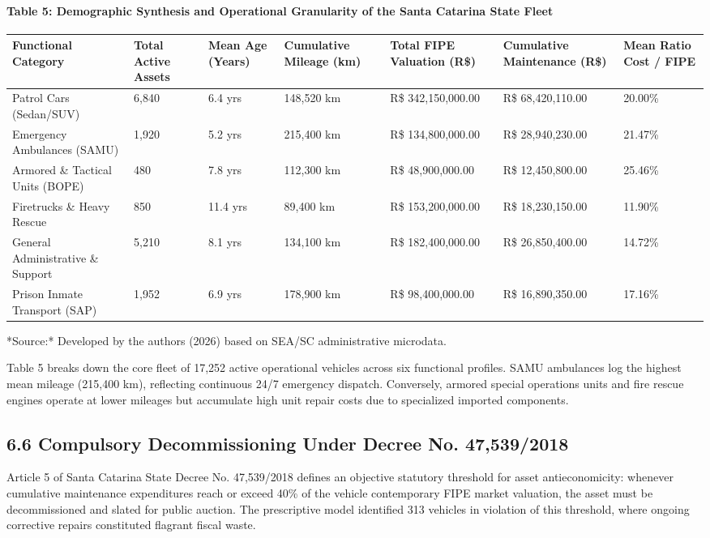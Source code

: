 \documentclass[10pt,a4paper,journal]{article}
\begin{document}
\paragraph{Table 5: Demographic Synthesis and Operational Granularity of the Santa Catarina State Fleet}
\begin{table}[htbp]
\centering
\small
\begin{tabular}{lllllll}
\toprule
Functional Category & Total Active Assets & Mean Age (Years) & Cumulative Mileage (km) & Total FIPE Valuation (R\$) & Cumulative Maintenance (R\$) & Mean Ratio Cost / FIPE \\
\midrule
Patrol Cars (Sedan/SUV) & 6,840 & 6.4 yrs & 148,520 km & R\$ 342,150,000.00 & R\$ 68,420,110.00 & 20.00\% \\
Emergency Ambulances (SAMU) & 1,920 & 5.2 yrs & 215,400 km & R\$ 134,800,000.00 & R\$ 28,940,230.00 & 21.47\% \\
Armored \& Tactical Units (BOPE) & 480 & 7.8 yrs & 112,300 km & R\$ 48,900,000.00 & R\$ 12,450,800.00 & 25.46\% \\
Firetrucks \& Heavy Rescue & 850 & 11.4 yrs & 89,400 km & R\$ 153,200,000.00 & R\$ 18,230,150.00 & 11.90\% \\
General Administrative \& Support & 5,210 & 8.1 yrs & 134,100 km & R\$ 182,400,000.00 & R\$ 26,850,400.00 & 14.72\% \\
Prison Inmate Transport (SAP) & 1,952 & 6.9 yrs & 178,900 km & R\$ 98,400,000.00 & R\$ 16,890,350.00 & 17.16\% \\
\bottomrule
\end{tabular}
\end{table}
*Source:* Developed by the authors (2026) based on SEA/SC administrative microdata.

Table 5 breaks down the core fleet of 17,252 active operational vehicles across six functional profiles. SAMU ambulances log the highest mean mileage (215,400 km), reflecting continuous 24/7 emergency dispatch. Conversely, armored special operations units and fire rescue engines operate at lower mileages but accumulate high unit repair costs due to specialized imported components.

\subsection{6.6 Compulsory Decommissioning Under Decree No. 47,539/2018}
Article 5 of Santa Catarina State Decree No. 47,539/2018 defines an objective statutory threshold for asset antieconomicity: whenever cumulative maintenance expenditures reach or exceed 40\% of the vehicle contemporary FIPE market valuation, the asset must be decommissioned and slated for public auction. The prescriptive model identified 313 vehicles in violation of this threshold, where ongoing corrective repairs constituted flagrant fiscal waste.
\end{document}
